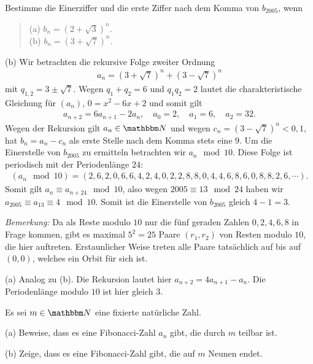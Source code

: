 \documentclass[11pt,a4paper]{article}
\begin{document}
\begin{aufgabe}
Bestimme die Einerziffer und die erste Ziffer nach dem Komma von $b_{2005}$,
wenn
\begin{quote}
(a) $ b_n=(2+\sqrt{3})^{n}$.\\
(b) $ b_{n}= (3+\sqrt{7})^{n}  $.
\end{quote}
\end{aufgabe}

\begin{loesung}
(b) Wir betrachten die rekursive Folge zweiter Ordnung
\begin{gather*}
a_n= (3+\sqrt{7})^n + (3-\sqrt{7})^n
\end{gather*}
mit $q_{1,2}=3\pm \sqrt{7}$. Wegen $q_1 +q_2 =6 $ und $q_1q_2=2$ lautet die 
charakteristische Gleichung für $(a_n)$, $0=x^2 -6x +2$ und somit gilt
\begin{gather*}
a_{n+2} = 6 a_{n+1} -2 a_n,\quad a_0= 2,\quad a_1=6,\quad a_2=32.
\end{gather*}
Wegen der Rekursion gilt $a_n\in \N$ und wegen $c_n=(3-\sqrt{7})^n < 0,1$, hat
$b_n=a_n -c_n$ als erste Stelle nach dem Komma stets eine $9$.  Um die
Einerstelle von $b_{2005}$ zu ermitteln betrachten wir $a_n\mod 10$.  Diese
Folge ist periodisch mit der Periodenlänge $24$:
\begin{gather*}
(a_n\mod{10})=(2,6,2,0,6,6,4,2,4,0,2,2,8,8,0,4,4,6,8,6,0,8,8,2,6,\cdots).
\end{gather*}
Somit gilt $a_n \equiv a_{n+24} \mod{10}$, also wegen $2005\equiv 13\mod{24} $
haben wir  $a_{2005}\equiv a_{13} \equiv 4\mod{10}$.
Somit ist die Einerstelle von $b_{2005} $ gleich $4-1=3$.

\emph{Bemerkung:} Da als Reste modulo $10 $ nur die fünf geraden Zahlen
$0,2,4,6,8$ in Frage kommen, gibt es maximal $5^2=25 $ Paare $(r_1,r_2)$ von
Resten modulo $10$, die hier auftreten. Erstaunlicher Weise treten alle Paare
tatsächlich auf bis auf $(0,0)$, welches ein Orbit für sich ist.

(a) Analog zu (b). Die Rekursion lautet hier $a_{n+2}= 4 a_{n+1} -a_n$.  Die
Periodenlänge modulo $10$ ist hier gleich $3$.
\end{loesung}

\begin{aufgabe} Es sei $m\in \N $ eine fixierte natürliche Zahl.

(a) Beweise, dass es eine {\sc Fibonacci}-Zahl $a_n$ gibt, die durch $m$
  teilbar ist.

(b) Zeige, dass es eine {\sc Fibonacci}-Zahl gibt, die auf $m $ Neunen endet.
\end{aufgabe}
\end{document}
